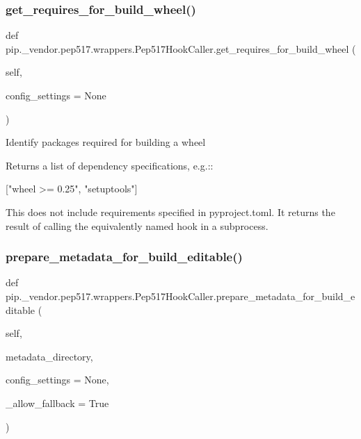 \subsubsection{\texorpdfstring{get\+\_\+requires\+\_\+for\+\_\+build\+\_\+wheel()}{get\_requires\_for\_build\_wheel()}}
{\footnotesize\ttfamily def pip.\+\_\+vendor.\+pep517.\+wrappers.\+Pep517\+Hook\+Caller.\+get\+\_\+requires\+\_\+for\+\_\+build\+\_\+wheel (\begin{DoxyParamCaption}\item[{}]{self,  }\item[{}]{config\+\_\+settings = {\ttfamily None} }\end{DoxyParamCaption})}

\begin{DoxyVerb}Identify packages required for building a wheel

Returns a list of dependency specifications, e.g.::

    ["wheel >= 0.25", "setuptools"]

This does not include requirements specified in pyproject.toml.
It returns the result of calling the equivalently named hook in a
subprocess.
\end{DoxyVerb}
 \mbox{\label{classpip_1_1__vendor_1_1pep517_1_1wrappers_1_1Pep517HookCaller_a62e4be46365e6b164be9c18ad2ed8edc}} 
\subsubsection{\texorpdfstring{prepare\+\_\+metadata\+\_\+for\+\_\+build\+\_\+editable()}{prepare\_metadata\_for\_build\_editable()}}
{\footnotesize\ttfamily def pip.\+\_\+vendor.\+pep517.\+wrappers.\+Pep517\+Hook\+Caller.\+prepare\+\_\+metadata\+\_\+for\+\_\+build\+\_\+editable (\begin{DoxyParamCaption}\item[{}]{self,  }\item[{}]{metadata\+\_\+directory,  }\item[{}]{config\+\_\+settings = {\ttfamily None},  }\item[{}]{\+\_\+allow\+\_\+fallback = {\ttfamily True} }\end{DoxyParamCaption})}

